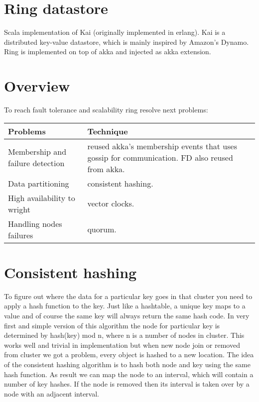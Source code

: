 \section*{Ring datastore}

Scala implementation of Kai (originally implemented in erlang).
Kai is a distributed key-value datastore, which is mainly inspired
by Amazon's Dynamo. Ring is implemented on top of akka and injected as akka extension.

\section*{Overview}

To reach fault tolerance and scalability ring resolve next problems:
 \hline

\begin{center}
      \begin{tabular}{| l | l |}
          Problems & Technique \\ \hline
          Membership and failure detection & reused akka's membership events that uses gossip for communication. FD also reused from akka. \\ \hline
          Data partitioning  & consistent hashing. \\ \hline
          High availability to wright  & vector clocks. \\ \hline
          Handling nodes failures   & quorum. \\ \hline
      \end{tabular}
\end{center}


\section*{Consistent hashing}

To figure out where the data for a particular key goes in that cluster you need to apply a hash function to the key.
Just like a hashtable, a unique key maps to a value and of course the same key will always return the same hash code.
In very first and simple version of this algorithm the node for particular key is determined by hash(key) mod n, where n is a number of
nodes in cluster. This works well and trivial in implementation but when new node join or removed from cluster we got a problem, every object is hashed to a new location.
The idea of the consistent hashing algorithm is to hash both node and key using the same hash function.
As result we can map the node to an interval, which will contain a number of key hashes. If the node is removed
then its interval is taken over by a node with an adjacent interval.

